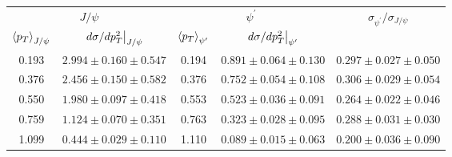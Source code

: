 \begin{tabular}{cc|cc|c}
\hline
\multicolumn{2}{c|}{$J/\psi$} &
  \multicolumn{2}{c|}{$\psi^{\prime}$} &
  \multirow{2}{*}{$\sigma_{\psi^\prime}/\sigma_{J/\psi}$} \\ \cline{1-4}
$\expval{p_T}_{J/\psi}$ &
  $\eval{d\sigma/dp_T^2}_{J/\psi}$ &
  $\expval{p_T}_{\psi^\prime}$ &
  $\eval{d\sigma/dp_T^2}_{\psi^\prime}$ &
   \\ \hline
\multicolumn{1}{c|}{0.193} &
  $2.994\pm0.160\pm0.547$ &
  \multicolumn{1}{c|}{0.194} &
  $0.891\pm0.064\pm0.130$ &
  $0.297\pm0.027\pm0.050$ \\
\multicolumn{1}{c|}{0.376} &
  $2.456\pm0.150\pm0.582$ &
  \multicolumn{1}{c|}{0.376} &
  $0.752\pm0.054\pm0.108$ &
  $0.306\pm0.029\pm0.054$ \\
\multicolumn{1}{c|}{0.550} &
  $1.980\pm0.097\pm0.418$ &
  \multicolumn{1}{c|}{0.553} &
  $0.523\pm0.036\pm0.091$ &
  $0.264\pm0.022\pm0.046$ \\
\multicolumn{1}{c|}{0.759} &
  $1.124\pm0.070\pm0.351$ &
  \multicolumn{1}{c|}{0.763} &
  $0.323\pm0.028\pm0.095$ &
  $0.288\pm0.031\pm0.030$ \\
\multicolumn{1}{c|}{1.099} &
  $0.444\pm0.029\pm0.110$ &
  \multicolumn{1}{c|}{1.110} &
  $0.089\pm0.015\pm0.063$ &
  $0.200\pm0.036\pm0.090$ \\ \hline
\end{tabular}
